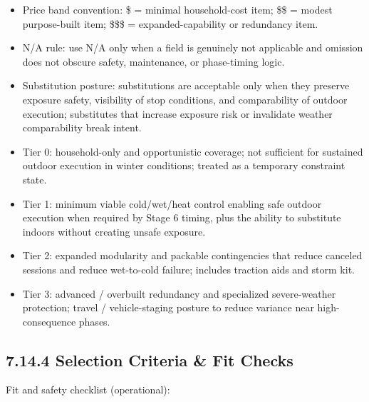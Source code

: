 \documentclass[10pt]{article}
\begin{document}
\begin{itemize}
\item Price band convention: \$ = minimal household-cost item; \$\$ = modest purpose-built item; \$\$\$ = expanded-capability or redundancy item.
\item N/A rule: use N/A only when a field is genuinely not applicable and omission does not obscure safety, maintenance, or phase-timing logic.
\item Substitution posture: substitutions are acceptable only when they preserve exposure safety, visibility of stop conditions, and comparability of outdoor execution; substitutes that increase exposure risk or invalidate weather comparability break intent.
\item Tier 0: household-only and opportunistic coverage; not sufficient for sustained outdoor execution in winter conditions; treated as a temporary constraint state.
\item Tier 1: minimum viable cold/wet/heat control enabling safe outdoor execution when required by Stage 6 timing, plus the ability to substitute indoors without creating unsafe exposure.
\item Tier 2: expanded modularity and packable contingencies that reduce canceled sessions and reduce wet-to-cold failure; includes traction aids and storm kit.
\item Tier 3: advanced / overbuilt redundancy and specialized severe-weather protection; travel / vehicle-staging posture to reduce variance near high-consequence phases.
\end{itemize}

\subsection*{7.14.4 Selection Criteria \& Fit Checks}
{}

Fit and safety checklist (operational):
\end{document}
